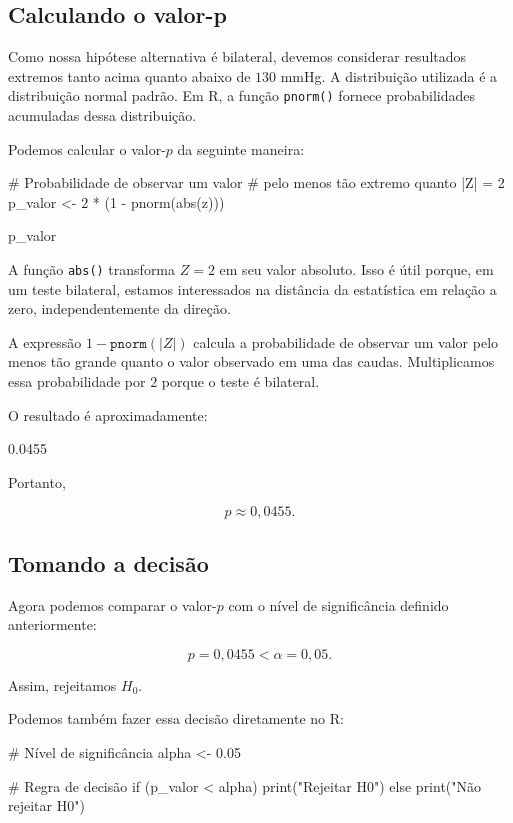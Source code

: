 \subsection{Calculando o valor-p}

Como nossa hipótese alternativa é bilateral, devemos considerar resultados extremos tanto acima quanto abaixo de
$130$ mmHg. A distribuição utilizada é a distribuição normal padrão. Em R, a função
\texttt{pnorm()} fornece probabilidades acumuladas dessa distribuição.

Podemos calcular o valor-$p$ da seguinte maneira:

\begin{code}
# Probabilidade de observar um valor
# pelo menos tão extremo quanto |Z| = 2
p_valor <- 2 * (1 - pnorm(abs(z)))

p_valor
\end{code}

A função \texttt{abs()} transforma $Z=2$ em seu valor absoluto. Isso é útil
porque, em um teste bilateral, estamos interessados na distância da estatística
em relação a zero, independentemente da direção.

A expressão $1-\texttt{pnorm}(|Z|)$ calcula a probabilidade de observar um valor pelo menos tão grande quanto o
valor observado em uma das caudas. Multiplicamos essa probabilidade por $2$
porque o teste é bilateral.

O resultado é aproximadamente:

\begin{code} 0.0455
\end{code}

Portanto,

\[
p\approx0{,}0455.
\]

\subsection{Tomando a decisão}

Agora podemos comparar o valor-$p$ com o nível de significância definido
anteriormente:

\[
p=0{,}0455 < \alpha=0{,}05.
\]

Assim, rejeitamos $H_0$.

Podemos também fazer essa decisão diretamente no R:

\begin{code}
# Nível de significância
alpha <- 0.05

# Regra de decisão
if (p_valor < alpha) {
  print("Rejeitar H0")
} else {
  print("Não rejeitar H0")
}
\end{code}


